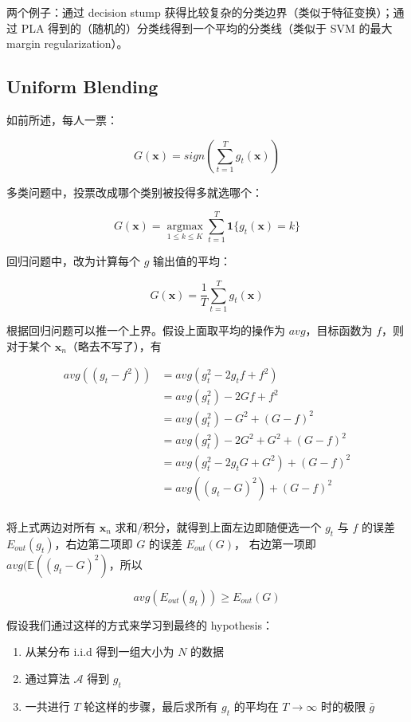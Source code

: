 \documentclass[a4paper]{article}
\begin{document}
两个例子：通过 decision stump 获得比较复杂的分类边界（类似于特征变换）；通过 PLA 得到的（随机的）分类线得到一个平均的分类线（类似于 SVM 的最大 margin regularization）。


\subsection{Uniform Blending}
如前所述，每人一票：

$$G(\mathbf{x}) = sign(\sum_{t=1}^{T}g_t(\mathbf{x}))$$

多类问题中，投票改成哪个类别被投得多就选哪个：

$$G(\mathbf{x}) = \operatorname*{argmax}_{1 \le k \le K}\sum_{t=1}^{T}\mathbf{1}\{g_t(\mathbf{x}) = k\}$$

回归问题中，改为计算每个 $g$ 输出值的平均：

$$G(\mathbf{x}) = \frac{1}{T}\sum_{t=1}^{T}g_t(\mathbf{x})$$

根据回归问题可以推一个上界。假设上面取平均的操作为 $avg$，目标函数为 $f$，则对于某个 $\mathbf{x}_n$（略去不写了），有

\begin{equation}
\begin{aligned}
avg((g_t - f^2)) &= avg(g_t^2 - 2g_tf + f^2) \\
                 &= avg(g_t^2) - 2Gf + f^2 \\
                 &= avg(g_t^2) - G^2 + (G - f)^2 \\
                 &= avg(g_t^2) - 2G^2 + G^2 + (G - f)^2 \\
                 &= avg(g_t^2 - 2g_tG + G^2) + (G - f)^2 \\
                 &= avg((g_t - G)^2) + (G - f)^2 \\
\end{aligned}
\end{equation}

将上式两边对所有 $\mathbf{x}_n$ 求和/积分，就得到上面左边即随便选一个 $g_t$ 与 $f$ 的误差 $E_{out}(g_t)$，右边第二项即 $G$ 的误差 $E_{out}(G)$，
右边第一项即 $avg(\mathbb{E}((g_t - G)^2)$，所以

$$avg(E_{out}(g_t)) \ge E_{out}(G)$$

假设我们通过这样的方式来学习到最终的 hypothesis：
\begin{enumerate}
  \item 从某分布 i.i.d 得到一组大小为 $N$ 的数据 \\
  \item 通过算法 $\mathcal{A}$ 得到 $g_t$ \\
  \item 一共进行 $T$ 轮这样的步骤，最后求所有 $g_t$ 的平均在 $T \rightarrow \infty$ 时的极限 $\bar{g}$ \\
\end{enumerate}
\end{document}
